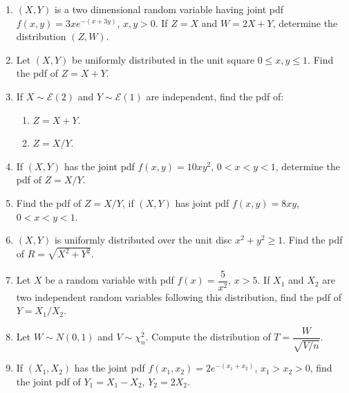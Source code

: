 \documentclass[svgnames]{amsart}
\begin{document}
\begin{enumerate}[leftmargin=*, itemsep=2mm]
\item $(X, Y)$ is a two dimensional random variable having joint pdf $f(x, y) = 3xe^{-(x+3y)}$, $x,y > 0$. If $Z = X$ and $W = 2X + Y$, determine the distribution $(Z, W)$.

\item Let $(X, Y)$ be uniformly distributed in the unit square $0 \le x, y \le 1$. Find the pdf of $Z = X + Y$.

\item If $X \sim \mathcal E(2)$ and $Y \sim \mathcal E(1)$ are independent, find the pdf of:
\begin{enumerate}
	\item $Z = X + Y$.
	\item $Z = X/Y$.
\end{enumerate}

\item If $(X, Y)$ has the joint pdf $f(x, y) = 10xy^2$, $0 < x < y < 1$, determine the pdf of $Z = X/Y$.

\item Find the pdf of $Z = X/Y$, if $(X, Y)$ has joint pdf $f(x, y) = 8xy$, $0 < x < y < 1$.

\item $(X, Y)$ is uniformly distributed over the unit disc $x^2 + y^2 \ge 1$. Find the pdf of $R = \sqrt{X^2 + Y^2}$.

\item Let $X$ be a random variable with pdf $f(x) = \dfrac 5 {x^2}$, $x > 5$. If $X_1$ and $X_2$ are two independent random variables following this distribution, find the pdf of $Y = X_1/X_2$.

\item Let $W \sim N(0, 1)$ and $V \sim \chi^2_n$. Compute the distribution of $T = \dfrac{W}{\sqrt{V/n}}$.

\item If $(X_1, X_2)$ has the joint pdf $f(x_1, x_2) = 2e^{-(x_1 + x_2)}$, $x_1 > x_2 > 0$, find the joint pdf of $Y_1 = X_1 - X_2$, $Y_2 = 2X_2$.

\end{enumerate}
\end{document}
